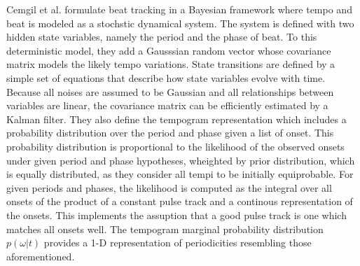 \documentclass{scrartcl}
\begin{document}

Cemgil et al. \cite{Cemgil2001} formulate beat tracking in a Bayesian framework where tempo and beat is modeled as a stochstic dynamical system. The system is defined with two hidden state variables, namely the period and the phase of beat. To this deterministic model, they add a Gausssian random vector whose covariance matrix models the likely tempo variations. State transitions are defined by a simple set of equations that describe how state variables evolve with time. 
Because all noises are assumed to be Gaussian and all relationships between variables are linear, the covariance matrix can be efficiently estimated by a Kalman filter. They also define the tempogram representation which includes a probability distribution over the period and phase given a list of onset. This probability distribution is proportional to the likelihood of the observed onsets under given period and phase hypotheses, wheighted by prior distribution, which is equally distributed, as they consider all tempi to be initially equiprobable. For given periods and phases, the likelihood is computed as the integral over all onsets of the product of a constant pulse track and a continous representation of the onsets. This implements the assuption that a good pulse track is one which matches all onsets well. The tempogram marginal probability distribution $p(\omega | t)$ provides a 1-D representation of periodicities resembling those aforementioned. 
\end{document}
